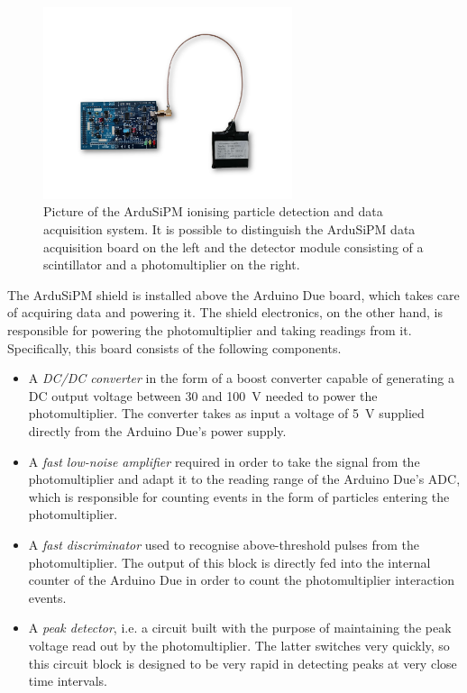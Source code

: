 \begin{figure}[h!]
    \centering
    \includegraphics[width=0.65\textwidth]{Images/chap3/ardusipm_cropped.pdf}
    \caption{Picture of the ArduSiPM ionising particle detection and data acquisition system. It is possible to distinguish the ArduSiPM data acquisition board on the left and the detector module consisting of a scintillator and a photomultiplier on the right.}
    \label{figArduiSiPM}
\end{figure}

The ArduSiPM shield is installed above the Arduino Due board, which takes care of acquiring data and powering it. The shield electronics, on the other hand, is responsible for powering the photomultiplier and taking readings from it. Specifically, this board consists of the following components.

\begin{itemize}
    \itemsep0em
    \item A \textit{DC/DC converter} in the form of a boost converter capable of generating a DC output voltage between 30 and \SI{100}{\volt} needed to power the photomultiplier. The converter takes as input a voltage of \SI{5}{\volt} supplied directly from the Arduino Due's power supply.
    \item A \textit{fast low-noise amplifier} required in order to take the signal from the photomultiplier and adapt it to the reading range of the Arduino Due's ADC, which is responsible for counting events in the form of particles entering the photomultiplier.
    \item A \textit{fast discriminator} used to recognise above-threshold pulses from the photomultiplier. The output of this block is directly fed into the internal counter of the Arduino Due in order to count the photomultiplier interaction events.
    \item A \textit{peak detector}, i.e. a circuit built with the purpose of maintaining the peak voltage read out by the photomultiplier. The latter switches very quickly, so this circuit block is designed to be very rapid in detecting peaks at very close time intervals.
\end{itemize}

